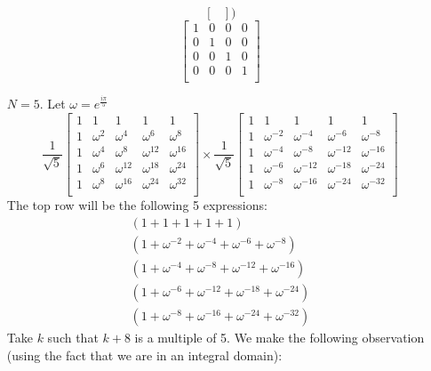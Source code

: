 \documentclass[11pt]{article}
\begin{document}
\begin{itemize}
$$\begin{bmatrix}
	\end{bmatrix}
	)
	$$
	$$
	\begin{bmatrix}
	1 & 0 & 0 & 0 \\
	0 & 1 & 0 & 0 \\
	0 & 0 & 1 & 0 \\
	0 & 0 & 0 & 1 \\
	\end{bmatrix}
	$$
\newpage
\item[$N = 5$.]  
	Let $\omega = e^{\frac{i\pi}{5}}$
	$$
	\frac{1}{\sqrt{5}}
	\begin{bmatrix}
		1 & 1 & 1 & 1 & 1 \\
		1 & \omega^2 & \omega^4    & \omega^6     & \omega^8     \\
		1 & \omega^4 & \omega^8    & \omega^{12}  & \omega^{16}  \\
		1 & \omega^6 & \omega^{12} & \omega^{18}  & \omega^{24}  \\
		1 & \omega^8 & \omega^{16} & \omega^{24}  & \omega^{32}  \\
	\end{bmatrix}
	\times
	\frac{1}{\sqrt{5}}
	\begin{bmatrix}
		1 & 1 & 1 & 1 & 1 \\
		1 & \omega^{-2} & \omega^{-4}  & \omega^{-6}   & \omega^{-8}   \\
		1 & \omega^{-4} & \omega^{-8}  & \omega^{-12}  & \omega^{-16}  \\
		1 & \omega^{-6} & \omega^{-12} & \omega^{-18}  & \omega^{-24}  \\
		1 & \omega^{-8} & \omega^{-16} & \omega^{-24}  & \omega^{-32}  \\
	\end{bmatrix}
	$$
	The top row will be the following 5 expressions:
	\begin{align*}
	(1 + 1 + 1 + 1 + 1) \\
	(1 + \omega^{-2} + \omega^{-4} + \omega^{-6} + \omega^{-8}) \\
	(1 + \omega^{-4} + \omega^{-8} + \omega^{-12} + \omega^{-16}) \\
	(1 + \omega^{-6} + \omega^{-12} + \omega^{-18} + \omega^{-24}) \\
	(1 + \omega^{-8} + \omega^{-16} + \omega^{-24} + \omega^{-32}) 
	\end{align*}
	Take $k$ such that $k + 8$ is a multiple of 5. We make the following observation (using the fact that we are in an integral domain):

\end{itemize}
\end{document}

